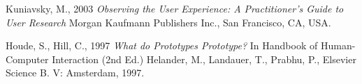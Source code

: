 \documentclass[b5paper, 11pt, norsk]{MScthesisITEM}
\begin{document}
\begin{thebibliography}{99}
Kuniavsky, M., 2003 
\emph{Observing the User Experience: A Practitioner's Guide to User Research}
Morgan Kaufmann Publishers Inc., San Francisco, CA, USA.

Houde, S., Hill, C., 1997
\emph{What do Prototypes Prototype?}
In Handbook of Human-Computer Interaction (2nd Ed.)
Helander, M., Landauer, T., Prabhu, P.,
Elsevier Science B. V:
Amsterdam, 1997.

\end{thebibliography}

\end{document}
